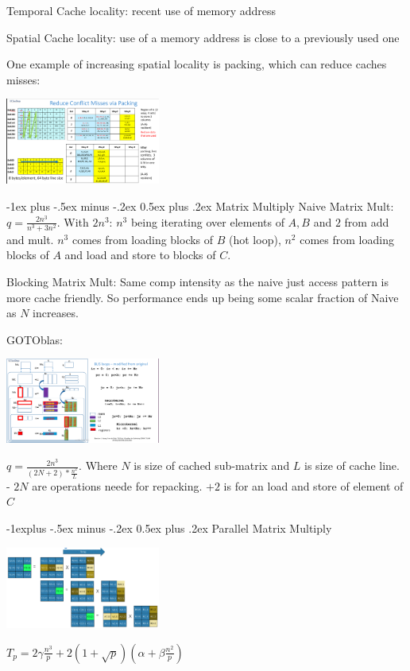 \documentclass[letter,8pt,landscape]{article}
\makeatletter
\renewcommand{\section}{\@startsection{section}{1}{0mm}%
                                {-1ex plus -.5ex minus -.2ex}%
                                {0.5ex plus .2ex}%
                                {\normalfont\large\bfseries}}
\renewcommand{\subsection}{\@startsection{subsection}{2}{0mm}%
                                {-1explus -.5ex minus -.2ex}%
                                {0.5ex plus .2ex}%
                                {\normalfont\normalsize\bfseries}}
\makeatother
\begin{document}
\begin{multicols}{3}
  Temporal Cache locality: recent use of memory address

  Spatial Cache locality: use of a memory address is close to a previously used
  one

  One example of increasing spatial locality is packing, which can reduce caches misses:
  \begin{center}
    \includegraphics[width=2in]{images/packing.png}
  \end{center}

  \section{Matrix Multiply}
  Naive Matrix Mult: $q = \frac{2n^3}{n^3 + 3n^2}$. With $2n^3$: $n^3$ being
  iterating over elements of $A,B$ and $2$ from add and mult. $n^3$ comes from
  loading blocks of $B$ (hot loop), $n^2$ comes from loading blocks of $A$ and
  load and store to blocks of $C$.

  Blocking Matrix Mult: Same comp intensity as the naive just access pattern is
  more cache friendly. So performance ends up being some scalar fraction of
  Naive as $N$ increases.

  GOTOblas:
  \begin{center}
    \includegraphics[width=2in]{images/gotoblas.jpg}
  \end{center}

  $q = \frac{2n^3}{(2N + 2) * \frac{n^2}{L}}$. Where $N$ is size of cached
  sub-matrix and $L$ is size of cache line. - $2N$ are operations neede for
  repacking. $+2$ is for an load and store of element of $C$

  \subsection{Parallel Matrix Multiply}

  \begin{center}
    \includegraphics[width=2in]{images/cannon.jpg}
  \end{center}
  $T_p = 2\gamma\frac{n^3}{p} + 2 (1 + \sqrt{p})(\alpha + \beta\frac{n^2}{p})$


\end{multicols}
\end{document}
